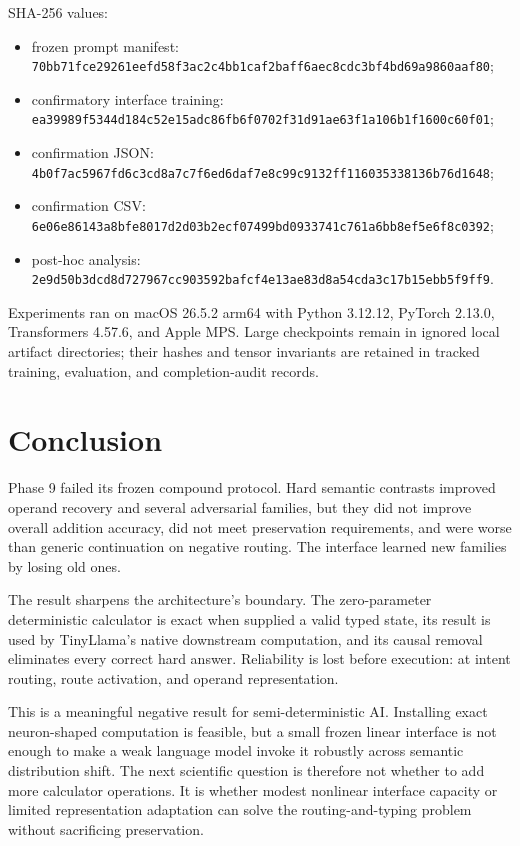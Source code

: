 \documentclass[11pt]{article}
\newcommand{\code}[1]{\texttt{#1}}
\begin{document}
SHA-256 values:

\begin{sloppypar}
\begin{itemize}
\scriptsize
\item frozen prompt manifest:
\code{70bb71fce29261eefd58f3ac2c4bb1caf2baff6aec8cdc3bf4bd69a9860aaf80};
\item confirmatory interface training:
\code{ea39989f5344d184c52e15adc86fb6f0702f31d91ae63f1a106b1f1600c60f01};
\item confirmation JSON:
\code{4b0f7ac5967fd6c3cd8a7c7f6ed6daf7e8c99c9132ff116035338136b76d1648};
\item confirmation CSV:
\code{6e06e86143a8bfe8017d2d03b2ecf07499bd0933741c761a6bb8ef5e6f8c0392};
\item post-hoc analysis:
\code{2e9d50b3dcd8d727967cc903592bafcf4e13ae83d8a54cda3c17b15ebb5f9ff9}.
\end{itemize}
\end{sloppypar}

Experiments ran on macOS 26.5.2 arm64 with Python 3.12.12, PyTorch 2.13.0,
Transformers 4.57.6, and Apple MPS. Large checkpoints remain in ignored local
artifact directories; their hashes and tensor invariants are retained in
tracked training, evaluation, and completion-audit records.

\section{Conclusion}

Phase 9 failed its frozen compound protocol. Hard semantic contrasts improved
operand recovery and several adversarial families, but they did not improve
overall addition accuracy, did not meet preservation requirements, and were
worse than generic continuation on negative routing. The interface learned
new families by losing old ones.

The result sharpens the architecture's boundary. The zero-parameter
deterministic calculator is exact when supplied a valid typed state, its result
is used by TinyLlama's native downstream computation, and its causal removal
eliminates every correct hard answer. Reliability is lost before execution:
at intent routing, route activation, and operand representation.

This is a meaningful negative result for semi-deterministic AI. Installing
exact neuron-shaped computation is feasible, but a small frozen linear
interface is not enough to make a weak language model invoke it robustly
across semantic distribution shift. The next scientific question is therefore
not whether to add more calculator operations. It is whether modest nonlinear
interface capacity or limited representation adaptation can solve the
routing-and-typing problem without sacrificing preservation.
\end{document}
